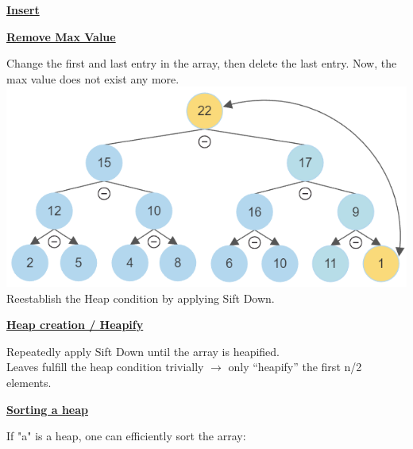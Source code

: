     {\centering\underline{\textbf{Insert}} \par}
        

    {\centering\underline{\textbf{Remove Max Value}} \par}
        Change the first and last entry in the array, then delete the last entry. Now, the max value does not exist any more.
        \includegraphics[width = \linewidth]{src/5_data_structure/images/heap_remove_max.png}
        Reestablish the Heap condition by applying Sift Down.
        

    {\centering\underline{\textbf{Heap creation / Heapify}} \par}
        Repeatedly apply Sift Down until the array is heapified.\\
        Leaves fulfill the heap condition trivially $\rightarrow$ only “heapify” the first n/2 elements.
        

    {\centering\underline{\textbf{Sorting a heap}} \par}
        If "a" is a heap, one can efficiently sort the array:
        
    
